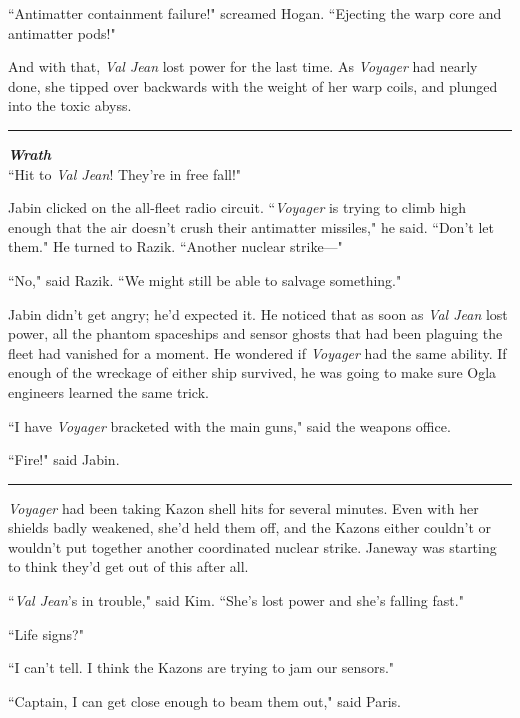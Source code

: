 \documentclass[twoside,letterpaper,12pt]{memoir}
\begin{document}
``Antimatter containment failure!" screamed Hogan. ``Ejecting the warp core and antimatter pods!"

And with that, \textit{Val Jean} lost power for the last time. As \textit{Voyager} had nearly done, she tipped over backwards with the weight of her warp coils, and plunged into the toxic abyss.

\begin{center}\rule{3cm}{0.4 pt}\end{center}

\noindent\textit{\textbf{Wrath}}\\

``Hit to \textit{Val Jean}! They're in free fall!"

Jabin clicked on the all-fleet radio circuit. ``\textit{Voyager} is trying to climb high enough that the air doesn't crush their antimatter missiles," he said. ``Don't let them." He turned to Razik. ``Another nuclear strike---"

``No," said Razik. ``We might still be able to salvage something."

Jabin didn't get angry; he'd expected it. He noticed that as soon as \textit{Val Jean} lost power, all the phantom spaceships and sensor ghosts that had been plaguing the fleet had vanished for a moment. He wondered if \textit{Voyager} had the same ability. If enough of the wreckage of either ship survived, he was going to make sure Ogla engineers learned the same trick.

``I have \textit{Voyager} bracketed with the main guns," said the weapons office.

``Fire!" said Jabin.

\begin{center}\rule{3cm}{0.4 pt}\end{center}

\textit{Voyager} had been taking Kazon shell hits for several minutes. Even with her shields badly weakened, she'd held them off, and the Kazons either couldn't or wouldn't put together another coordinated nuclear strike. Janeway was starting to think they'd get out of this after all.

``\textit{Val Jean}'s in trouble," said Kim. ``She's lost power and she's falling fast."

``Life signs?"

``I can't tell. I think the Kazons are trying to jam our sensors."

``Captain, I can get close enough to beam them out," said Paris.
\end{document}
